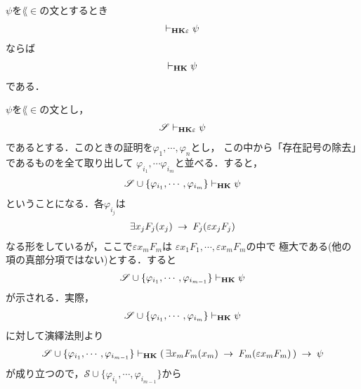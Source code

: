 	\begin{screen}
		\begin{metathm}
		\label{metathm:Henkin_expansion_2}
			$\psi$を$\lang{\in}$の文とするとき
			\begin{align}
				\vdash_{{\scriptsize \mbox{{\bf HK$\varepsilon$}}}} \psi
			\end{align}
			ならば
			\begin{align}
				\vdash_{{\scriptsize \mbox{{\bf HK}}}} \psi
			\end{align}
			である．
		\end{metathm}
	\end{screen}
	
	\begin{sketch}
		$\psi$を$\lang{\in}$の文とし，
		\begin{align}
			\mathscr{S} \vdash_{{\scriptsize \mbox{{\bf HK$\varepsilon$}}}} \psi
		\end{align}
		であるとする．このときの証明を$\varphi_{1},\cdots,\varphi_{n}$とし，
		この中から「存在記号の除去」であるものを全て取り出して
		$\varphi_{i_{1}},\cdots\varphi_{i_{m}}$と並べる．すると，
		\begin{align}
			\mathscr{S} \cup \{\varphi_{i_{1}},\cdots,\varphi_{i_{m}}\} 
			\vdash_{{\scriptsize \mbox{{\bf HK}}}} \psi
		\end{align}
		ということになる．各$\varphi_{i_{j}}$は
		\begin{align}
			\exists x_{j} F_{j}(x_{j}) \hspace{0.25em}\rightarrow\hspace{0.25em} F_{j}(\varepsilon x_{j} F_{j})
		\end{align}
		なる形をしているが，ここで$\varepsilon x_{m} F_{m}$は
		$\varepsilon x_{1} F_{1},\cdots,\varepsilon x_{m} F_{m}$の中で
		極大である(他の項の真部分項ではない)とする．すると
		\begin{align}
			\mathscr{S} \cup \{\varphi_{i_{1}},\cdots,\varphi_{i_{m-1}}\} 
			\vdash_{{\scriptsize \mbox{{\bf HK}}}} \psi
		\end{align}
		が示される．実際，
		\begin{align}
			\mathscr{S} \cup \{\varphi_{i_{1}},\cdots,\varphi_{i_{m}}\} 
			\vdash_{{\scriptsize \mbox{{\bf HK}}}} \psi
		\end{align}
		に対して演繹法則より
		\begin{align}
			\mathscr{S} \cup \{\varphi_{i_{1}},\cdots,\varphi_{i_{m-1}}\} 
			\vdash_{{\scriptsize \mbox{{\bf HK}}}} 
			(\, \exists x_{m} F_{m}(x_{m}) \hspace{0.25em}\rightarrow\hspace{0.25em} F_{m}(\varepsilon x_{m} F_{m})\, ) \hspace{0.25em}\rightarrow\hspace{0.25em} \psi
		\end{align}
		が成り立つので，$\mathscr{S} \cup \{\varphi_{i_{1}},\cdots,\varphi_{i_{m-1}}\}$から

\end{sketch}

